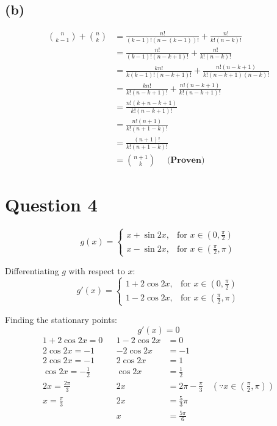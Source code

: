 \documentclass[11pt]{article}
\begin{document}
\subsection{(b)}
\label{sec:org9644bd9}

\begin{align*}
{n \choose k - 1} + {n \choose k} &= \frac{n!}{(k - 1)!(n - (k - 1))!} + \frac{n!}{k!(n - k)!} \\
&= \frac{n!}{(k - 1)!(n - k + 1)!} + \frac{n!}{k!(n - k)!} \\
&= \frac{kn!}{k(k - 1)!(n - k + 1)!} + \frac{n!(n - k + 1)}{k!(n - k + 1)(n - k)!} \\
&= \frac{kn!}{k!(n - k + 1)!} + \frac{n!(n - k + 1)}{k!(n - k + 1)!} \\
&= \frac{n!(k + n - k + 1)}{k!(n - k + 1)!} \\
&= \frac{n!(n + 1)}{k!(n + 1 - k)!} \\
&= \frac{(n + 1)!}{k!(n + 1 - k)!} \\
&= {n + 1 \choose k} \quad \textbf{ (Proven)}
\end{align*}

\newpage

\section{Question 4}
\label{sec:org04fc90b}

\[
g(x) = \begin{cases}
x + \sin 2x, & \text{for } x \in (0, \frac{\pi}{2}) \\
x - \sin 2x, & \text{for } x \in \left(\frac{\pi}{2}, \pi \right)
\end{cases}
\]

Differentiating \(g\) with respect to \(x\):
\[
g'(x) = \begin{cases}
1 + 2\cos 2x, & \text{for } x \in (0, \frac{\pi}{2}) \\
1 - 2\cos 2x, & \text{for } x \in \left(\frac{\pi}{2}, \pi \right)
\end{cases}
\]

Finding the stationary points:
\[g'(x) = 0\]
\begin{align*}
1 + 2\cos 2x = 0 && 1 - 2\cos 2x &= 0 \\
2\cos 2x = -1 && - 2\cos 2x &= -1 \\
2\cos 2x = -1 && 2\cos 2x &= 1 \\
\cos 2x = -\frac{1}{2} && \cos 2x &= \frac{1}{2} \\
2x = \frac{2\pi}{3} && 2x &= 2\pi - \frac{\pi}{3} \quad \left(\because x \in \left(\frac{\pi}{2}, \pi \right) \right) \\
x = \frac{\pi}{3} && 2x &= \frac{5}{3} \pi \\
&& x &= \frac{5\pi}{6} \\
\end{align*}
\end{document}
